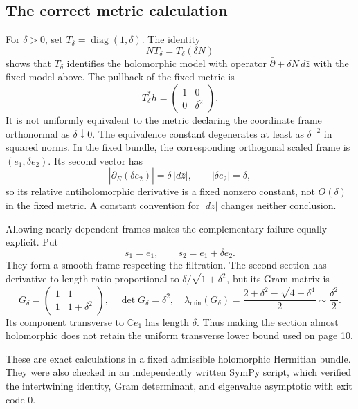 \documentclass[10pt]{article}
\begin{document}
\subsection*{The correct metric calculation}
For \(\delta>0\), set \(T_\delta=\operatorname{diag}(1,\delta)\). The identity \[NT_\delta=T_\delta(\delta N)\] shows that \(T_\delta\) identifies the holomorphic model with operator \(\bar\partial+\delta N\,d\bar z\) with the fixed model above. The pullback of the fixed metric is \[T_\delta^*h=
\begin{pmatrix}1&0\\0&\delta^2\end{pmatrix}.\] It is not uniformly equivalent to the metric declaring the coordinate frame orthonormal as \(\delta\downarrow0\). The equivalence constant degenerates at least as \(\delta^{-2}\) in squared norms. In the fixed bundle, the corresponding orthogonal scaled frame is \((e_1,\delta e_2)\). Its second vector has \[\left|\bar\partial_E(\delta e_2)\right|=\delta\,|d\bar z|,
\qquad |\delta e_2|=\delta,\] so its relative antiholomorphic derivative is a fixed nonzero constant, not \(O(\delta)\) in the fixed metric. A constant convention for \(|d\bar z|\) changes neither conclusion.\par
Allowing nearly dependent frames makes the complementary failure equally explicit. Put \[s_1=e_1,\qquad s_2=e_1+\delta e_2.\] They form a smooth frame respecting the filtration. The second section has derivative-to-length ratio proportional to \(\delta/\sqrt{1+\delta^2}\), but its Gram matrix is \[G_\delta=
\begin{pmatrix}1&1\\1&1+\delta^2\end{pmatrix},
\quad \det G_\delta=\delta^2,\quad
\lambda_{\min}(G_\delta)
=\frac{2+\delta^2-\sqrt{4+\delta^4}}2
\sim\frac{\delta^2}{2}.\] Its component transverse to \(\mathbb C e_1\) has length \(\delta\). Thus making the section almost holomorphic does not retain the uniform transverse lower bound used on page 10.\par
These are exact calculations in a fixed admissible holomorphic Hermitian bundle. They were also checked in an independently written SymPy script, which verified the intertwining identity, Gram determinant, and eigenvalue asymptotic with exit code 0.\par
\end{document}
